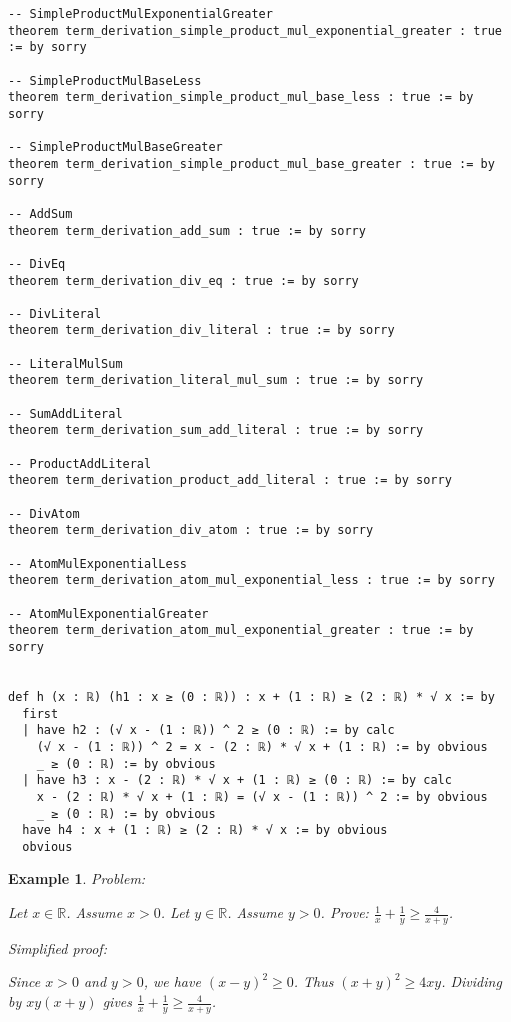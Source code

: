 \documentclass{article}
\newtheorem{example}{Example}
\begin{document}
\begin{tcolorbox}[colback=white!10, width=\linewidth]
\begin{lstlisting}[language=Lean4]
-- SimpleProductMulExponentialGreater
theorem term_derivation_simple_product_mul_exponential_greater : true := by sorry

-- SimpleProductMulBaseLess
theorem term_derivation_simple_product_mul_base_less : true := by sorry

-- SimpleProductMulBaseGreater
theorem term_derivation_simple_product_mul_base_greater : true := by sorry

-- AddSum
theorem term_derivation_add_sum : true := by sorry

-- DivEq
theorem term_derivation_div_eq : true := by sorry

-- DivLiteral
theorem term_derivation_div_literal : true := by sorry

-- LiteralMulSum
theorem term_derivation_literal_mul_sum : true := by sorry

-- SumAddLiteral
theorem term_derivation_sum_add_literal : true := by sorry

-- ProductAddLiteral
theorem term_derivation_product_add_literal : true := by sorry

-- DivAtom
theorem term_derivation_div_atom : true := by sorry

-- AtomMulExponentialLess
theorem term_derivation_atom_mul_exponential_less : true := by sorry

-- AtomMulExponentialGreater
theorem term_derivation_atom_mul_exponential_greater : true := by sorry


def h (x : ℝ) (h1 : x ≥ (0 : ℝ)) : x + (1 : ℝ) ≥ (2 : ℝ) * √ x := by
  first
  | have h2 : (√ x - (1 : ℝ)) ^ 2 ≥ (0 : ℝ) := by calc
    (√ x - (1 : ℝ)) ^ 2 = x - (2 : ℝ) * √ x + (1 : ℝ) := by obvious
    _ ≥ (0 : ℝ) := by obvious
  | have h3 : x - (2 : ℝ) * √ x + (1 : ℝ) ≥ (0 : ℝ) := by calc
    x - (2 : ℝ) * √ x + (1 : ℝ) = (√ x - (1 : ℝ)) ^ 2 := by obvious
    _ ≥ (0 : ℝ) := by obvious
  have h4 : x + (1 : ℝ) ≥ (2 : ℝ) * √ x := by obvious
  obvious

\end{lstlisting}
\end{tcolorbox}


\begin{example}
Problem:
\begin{tcolorbox}[colback=yellow!10, width=\linewidth]
Let $x\in\mathbb{R}$. Assume $x>0$.
    Let $y\in\mathbb{R}$. Assume $y>0$.
    Prove: $\frac{1}{x} + \frac{1}{y} \ge \frac{4}{x+y}$.
\end{tcolorbox}

Simplified proof:
\begin{tcolorbox}[colback=blue!10, width=\linewidth]
Since $x>0$ and $y>0$, we have $(x-y)^2 \ge 0$. Thus $(x+y)^2 \ge 4xy$. Dividing by $xy(x+y)$ gives $\frac{1}{x}+\frac{1}{y} \ge \frac{4}{x+y}$.
\end{tcolorbox}
\end{example}
\end{document}
